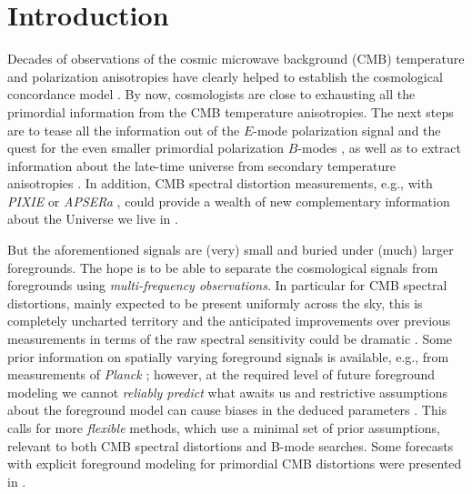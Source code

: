 \documentclass[usenatbib]{mn2e}
\begin{document}
\section{Introduction}
\label{sec:Intro}
Decades of observations of the cosmic microwave background (CMB) temperature and polarization anisotropies have clearly helped to establish the cosmological concordance model \citep[e.g.,][]{WMAP_params, Planck2015params}. By now, cosmologists are close to exhausting all the primordial information from the CMB temperature anisotropies. The next steps are to tease all the information out of the $E$-mode polarization signal and the quest for the even smaller primordial polarization $B$-modes \citep{Kogut2011, PRISM2013WPII, Matsumura2014, Abazajian2015}, as well as to extract information about the late-time universe from secondary temperature anisotropies \citep[e.g., CMB lensing and the Sunyaev-Zeldovich effect;][]{Abazajian2016S4SB}. In addition, CMB spectral distortion measurements, e.g., with {\it PIXIE} \citep{Kogut2011} or {\it APSERa} \citep{Mayuri2015}, could provide a wealth of new complementary information about the Universe we live in \citep[e.g.,][]{Chluba2011therm, Sunyaev2013, Chluba2013fore, Tashiro2014, Chluba2016}.

But the aforementioned signals are (very) small and buried under (much) larger foregrounds. The hope is to be able to separate the cosmological signals from foregrounds using {\it multi-frequency observations}. In particular for CMB spectral distortions, mainly expected to be present uniformly across the sky, this is completely uncharted territory and the anticipated improvements over previous measurements \citep{Mather1994, Fixsen1996} in terms of the raw spectral sensitivity could be dramatic \citep{Kogut2011, Kogut2016SPIE}. Some prior information on spatially varying foreground signals is available, e.g., from measurements of {\it Planck} \citep{Planck2013components, PlanckSM2015}; however, at the required level of future foreground modeling we cannot {\it reliably predict} what awaits us and restrictive assumptions about the foreground model can cause biases in the deduced parameters \citep[e.g.,][]{Errard2016, Remazeilles2016, Kogut2016}. This calls for more {\it flexible} methods, which use a minimal set of prior assumptions, relevant to both CMB spectral distortions and B-mode searches. Some forecasts with explicit foreground modeling for primordial CMB distortions were presented in \citet{abitbol_pixie}.
\end{document}
